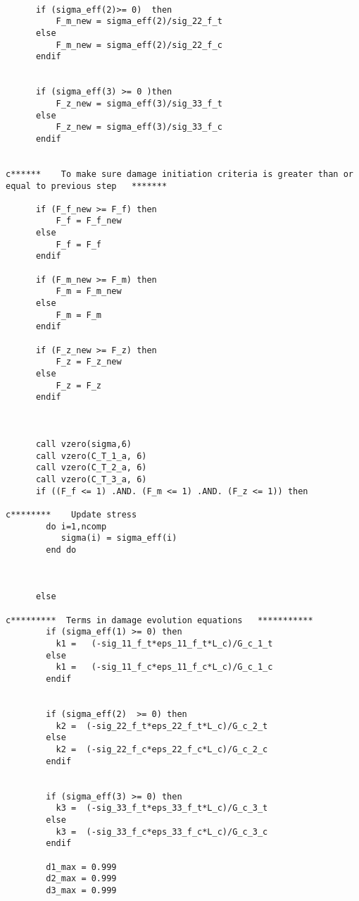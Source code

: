 \begin{lstlisting}
      
      if (sigma_eff(2)>= 0)  then         
          F_m_new = sigma_eff(2)/sig_22_f_t     
      else          
          F_m_new = sigma_eff(2)/sig_22_f_c                
      endif
          
      
      if (sigma_eff(3) >= 0 )then      
          F_z_new = sigma_eff(3)/sig_33_f_t           
      else       
          F_z_new = sigma_eff(3)/sig_33_f_c                     
      endif
            
      
c******    To make sure damage initiation criteria is greater than or equal to previous step   *******   
      
      if (F_f_new >= F_f) then          
          F_f = F_f_new          
      else          
          F_f = F_f          
      endif
      
      if (F_m_new >= F_m) then          
          F_m = F_m_new          
      else          
          F_m = F_m          
      endif
          
      if (F_z_new >= F_z) then          
          F_z = F_z_new         
      else          
          F_z = F_z          
      endif
 
      
      
      call vzero(sigma,6)
      call vzero(C_T_1_a, 6) 
      call vzero(C_T_2_a, 6)
      call vzero(C_T_3_a, 6) 
      if ((F_f <= 1) .AND. (F_m <= 1) .AND. (F_z <= 1)) then
 
c********    Update stress
        do i=1,ncomp
           sigma(i) = sigma_eff(i)       
        end do 
          

      
      else
          
c*********  Terms in damage evolution equations   ***********
        if (sigma_eff(1) >= 0) then
          k1 =   (-sig_11_f_t*eps_11_f_t*L_c)/G_c_1_t
        else 
          k1 =   (-sig_11_f_c*eps_11_f_c*L_c)/G_c_1_c
        endif
        
        
        if (sigma_eff(2)  >= 0) then
          k2 =  (-sig_22_f_t*eps_22_f_t*L_c)/G_c_2_t
        else 
          k2 =  (-sig_22_f_c*eps_22_f_c*L_c)/G_c_2_c
        endif
      
        
        if (sigma_eff(3) >= 0) then
          k3 =  (-sig_33_f_t*eps_33_f_t*L_c)/G_c_3_t
        else 
          k3 =  (-sig_33_f_c*eps_33_f_c*L_c)/G_c_3_c
        endif
       
        d1_max = 0.999
        d2_max = 0.999
        d3_max = 0.999
        

\end{lstlisting}
